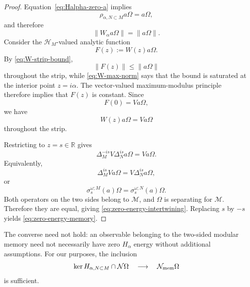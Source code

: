 \documentclass[a4paper,11pt]{article}
\theoremstyle{definition}
\begin{document}
\begin{proof}
Equation~\eqref{eq:Halpha-zero-a} implies
\begin{equation}
    \rho_{\alpha,N\subset M}a\Omega
    =
    a\Omega,
\end{equation}
and therefore
\begin{equation}
    \|W_\alpha a\Omega\|
    =
    \|a\Omega\|.
    \label{eq:W-max-norm}
\end{equation}
Consider the $\mathcal H_M$-valued analytic function
\begin{equation}
    F(z)
    :=
    W(z)a\Omega .
\end{equation}
By \eqref{eq:W-strip-bound},
\begin{equation}
    \|F(z)\|
    \leq
    \|a\Omega\|
\end{equation}
throughout the strip, while \eqref{eq:W-max-norm} says that the bound is
saturated at the interior point $z=i\alpha$. The vector-valued
maximum-modulus principle therefore implies that $F(z)$ is constant.
Since
\begin{equation}
    F(0)=Va\Omega,
\end{equation}
we have
\begin{equation}
    W(z)a\Omega=Va\Omega
\end{equation}
throughout the strip.

Restricting to $z=s\in\mathbb R$ gives
\begin{equation}
    \Delta_M^{-is}
    V\Delta_N^{is}a\Omega
    =
    Va\Omega.
\end{equation}
Equivalently,
\begin{equation}
    \Delta_M^{is}Va\Omega
    =
    V\Delta_N^{is}a\Omega,
\end{equation}
or
\begin{equation}
    \sigma_s^{\omega;M}(a)\Omega
    =
    \sigma_s^{\omega;N}(a)\Omega.
\end{equation}
Both operators on the two sides belong to $\mathcal M$, and $\Omega$ is
separating for $\mathcal M$. Therefore they are equal, giving
\eqref{eq:zero-energy-intertwining}. Replacing $s$ by $-s$ yields
\eqref{eq:zero-energy-memory}.
\end{proof}

The converse need not hold: an observable belonging to the two-sided modular
memory need not necessarily have zero $H_\alpha$ energy without additional
assumptions. For our purposes, the inclusion
\begin{equation}
    \ker H_{\alpha,N\subset M}\cap\mathcal N\Omega
    \quad\longrightarrow\quad
    \mathcal N_{\rm mem}\Omega
\end{equation}
is sufficient.
\end{document}
